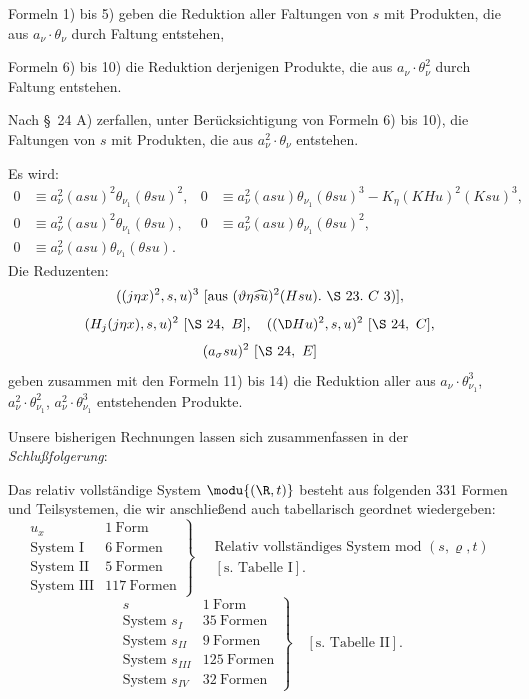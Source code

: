 Formeln 1) bis 5) geben die Reduktion aller Faltungen von $s$ mit Produkten, die aus $a_\nu\cdot\theta_\nu$ durch Faltung entstehen,

Formeln 6) bis 10) die Reduktion derjenigen Produkte, die aus $a_\nu\cdot\theta_\nu^2$ durch Faltung entstehen.

Nach \S\ 24 A) zerfallen, unter Berücksichtigung von Formeln 6) bis 10), die Faltungen von $s$ mit Produkten, die aus $a_\nu^2\cdot\theta_\nu$ entstehen.

Es wird:
\begin{align*}
0&\equiv a_\nu^2(asu)^2\theta_{\nu_1}(\theta su)^2,
&0&\equiv a_\nu^2(asu)\theta_{\nu_1}(\theta su)^3-K_\eta(KHu)^2(Ksu)^3,\\
0&\equiv a_\nu^2(asu)^2\theta_{\nu_1}(\theta su),
&0&\equiv a_\nu^2(asu)\theta_{\nu_1}(\theta su)^2,\\
0&\equiv a_\nu^2(asu)\theta_{\nu_1}(\theta su).
\end{align*}
Die Reduzenten:
\[
 ((j\eta x)^2,s,u)^3
 \ [\hbox{aus }(\vartheta\eta\widehat{su})^2(Hsu).\ \S\ 23.\ C\ 3)],
\]
\[
(H_j(j\eta x),s,u)^2\ [\S\ 24,\ B],
\quad ((\D Hu)^2,s,u)^2\ [\S\ 24,\ C],
\]
\[
(a_\sigma su)^2\ [\S\ 24,\ E]
\]
geben zusammen mit den Formeln 11) bis 14) die Reduktion aller aus
$a_\nu\cdot\theta_{\nu_1}^3$, $a_\nu^2\cdot\theta_{\nu_1}^2$, $a_\nu^2\cdot\theta_{\nu_1}^3$ entstehenden Produkte.

Unsere bisherigen Rechnungen lassen sich zusammenfassen in der
\emph{Schlußfolgerung}:

Das relativ vollständige System $\modu{(\R,t)}$ besteht aus folgenden 331 Formen und Teilsystemen, die wir anschließend auch tabellarisch geordnet wiedergeben:
\[
\left.
\begin{array}{lr}
u_x&1\ \text{Form}\\
\text{System I}&6\ \text{Formen}\\
\text{System II}&5\ \text{Formen}\\
\text{System III}&117\ \text{Formen}
\end{array}
\right\}
\quad
\begin{gathered}
\text{Relativ vollständiges System mod }(s,\varrho,t)\\
[\text{s. Tabelle I}].
\end{gathered}
\]
\[
\left.
\begin{array}{lr}
s&1\ \text{Form}\\
\text{System }s_I&35\ \text{Formen}\\
\text{System }s_{II}&9\ \text{Formen}\\
\text{System }s_{III}&125\ \text{Formen}\\
\text{System }s_{IV}&32\ \text{Formen}
\end{array}
\right\}
\quad [\text{s. Tabelle II}].
\]

